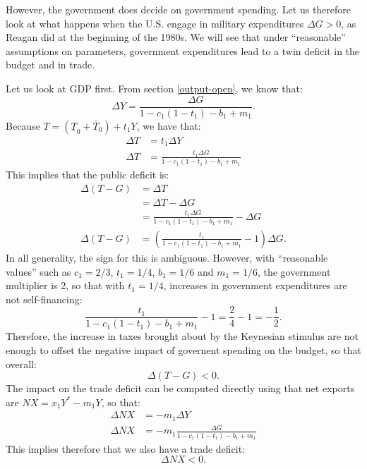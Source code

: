 \documentclass[]{book}
\theoremstyle{definition}
\theoremstyle{definition}
\theoremstyle{definition}
\theoremstyle{remark}
\begin{document}
However, the government does decide on government spending. Let us
therefore look at what happens when the U.S. engage in military
expenditures \(\Delta G>0\), as Reagan did at the beginning of the
1980s. We will see that under ``reasonable'' assumptions on parameters,
government expenditures lead to a twin deficit in the budget and in
trade.

Let us look at GDP first. From section \ref{output-open}, we know that:
\[\Delta Y = \frac{\Delta G}{1-c_1(1-t_1)-b_1+m_1}.\] Because
\(T=\left(\underline{T}_{0}+\bar{T}_{0}\right)+t_1 Y\), we have that: \[
\begin{aligned}
\Delta T &= t_1 \Delta Y\\
\Delta T&= \frac{t_1 \Delta G}{1-c_1(1-t_1)-b_1+m_1}
\end{aligned}
\] This implies that the public deficit is: \[
\begin{aligned}
\Delta (T-G)&=\Delta T\\
&= \Delta T - \Delta G \\
&= \frac{t_1 \Delta G}{1-c_1(1-t_1)-b_1+m_1} - \Delta G\\
\Delta (T-G)&=\left(\frac{t_1}{1-c_1(1-t_1)-b_1+m_1} - 1\right)\Delta G.
\end{aligned}
\] In all generality, the sign for this is ambiguous. However, with
``reasonable values'' such as \(c_1=2/3\), \(t_1=1/4\), \(b_1=1/6\) and
\(m_1=1/6\), the government multiplier is 2, so that with \(t_1=1/4\),
increases in government expenditures are not self-financing:
\[\frac{t_1}{1-c_1(1-t_1)-b_1+m_1} - 1 = \frac{2}{4}-1 = -\frac{1}{2}.\]
Therefore, the increase in taxes brought about by the Keynesian stimulus
are not enough to offset the negative impact of governent spending on
the budget, so that overall: \[\boxed{\Delta(T-G)<0}.\] The impact on
the trade deficit can be computed directly using that net exports are
\(NX=x_1 Y^{*} - m_1 Y\), so that: \[
\begin{aligned}
\Delta NX &= -m_1 \Delta Y\\
\Delta NX &= -m_1 \frac{\Delta G}{1-c_1(1-t_1)-b_1+m_1}
\end{aligned}
\] This implies therefore that we also have a trade deficit:
\[\boxed{\Delta NX <0}.\]
\end{document}

